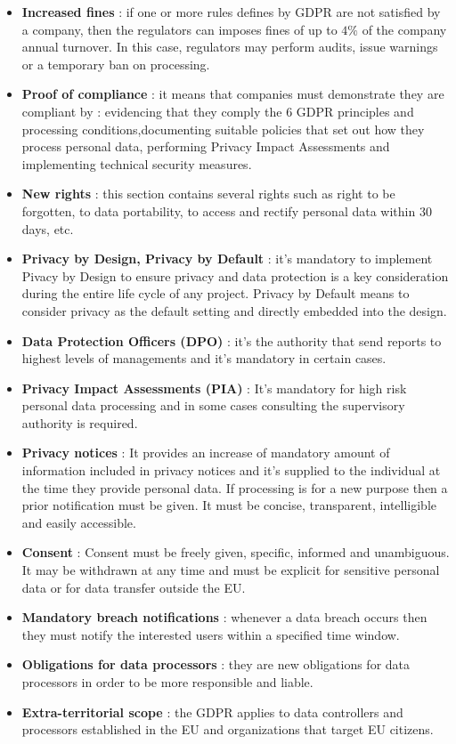 \begin{itemize}
\item \textbf{Increased fines} : if one or more rules defines by GDPR are not satisfied by a company, then the regulators can imposes fines of up to $4 \%$ of the company annual turnover. In this case, regulators may perform audits, issue warnings or a temporary ban on processing.
\item \textbf{Proof of compliance} : it means that companies must demonstrate they are compliant by : evidencing that they comply the $6$ GDPR principles and processing conditions,documenting suitable policies that set out how they process personal data, performing Privacy Impact Assessments and implementing technical security measures.
\item \textbf{New rights} : this section contains several rights such as right to be forgotten, to data portability, to access and rectify personal data within $30$ days, etc.
\item \textbf{Privacy by Design, Privacy by Default} : it's mandatory to implement Pivacy by Design to ensure privacy and data protection is a key consideration during the entire life cycle of any project. Privacy by Default means to consider privacy as the default setting and directly embedded into the design.
\item \textbf{Data Protection Officers (DPO)} : it's the authority that send reports to highest levels of managements and it's mandatory in certain cases.
\item \textbf{Privacy Impact Assessments (PIA)} : It's mandatory for high risk personal data processing and in some cases consulting the supervisory authority is required.
\item \textbf{Privacy notices} : It provides an increase of mandatory amount of information included in privacy notices and it's supplied to the individual at the time they provide personal data. If processing is for a new purpose then a prior notification must be given. It must be concise, transparent, intelligible and easily accessible.
\item \textbf{Consent} : Consent must be freely given, specific, informed and unambiguous. It may be withdrawn at any time and must be explicit for sensitive personal data or for data transfer outside the EU.
\item \textbf{Mandatory breach notifications} : whenever a data breach occurs then they must notify the interested users within a specified time window.
\item \textbf{Obligations for data processors} : they are new obligations for data processors in order to be more responsible and liable.
\item \textbf{Extra-territorial scope} : the GDPR applies to data controllers and processors established in the EU and organizations that target EU citizens.
\end{itemize}
